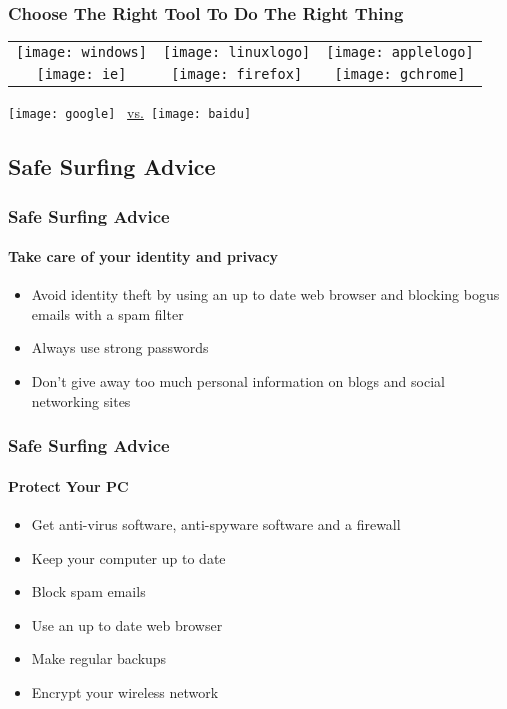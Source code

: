 \documentclass[hyperref={xetex,colorlinks,linkcolor=blue},green,compress]{beamer}
\newcommand\googlelogo{\texttt{[image: google]}}
\begin{document}
\begin{frame}\frametitle{Choose The Right Tool To Do The Right Thing}

\begin{center}
\begin{tabular}{ccc}
  \texttt{[image: windows]}&\texttt{[image: linuxlogo]}&\texttt{[image: applelogo]}\\
  \texttt{[image: ie]}&\texttt{[image: firefox]}&\texttt{[image: gchrome]}
\end{tabular}
\end{center}

\begin{center}
\begin{Huge}
\googlelogo{} ~\href{http://www.google.com/search?q=google+vs+baidu&ie=utf-8&oe=utf-8&aq=t&rls=org.debian:en-US:unofficial&client=iceweasel-a}{vs.}~\texttt{[image: baidu]}
\end{Huge}
\end{center}             

\end{frame}

\subsection[Advices]{Safe Surfing Advice}
\label{sec:advice}

\begin{frame}\frametitle{Safe Surfing Advice}\framesubtitle{Take care of your identity and privacy}

\begin{itemize}
\item Avoid identity theft by using an up to date web browser and blocking bogus emails with a spam filter
\item Always use strong passwords
\item Don’t give away too much personal information on blogs and social networking sites
\end{itemize}

\end{frame}

\begin{frame}\frametitle{Safe Surfing Advice}\framesubtitle{Protect Your PC}

\begin{itemize}
\item Get anti-virus software, anti-spyware software and a firewall
\item Keep your computer up to date
\item Block spam emails
\item Use an up to date web browser
\item Make regular backups
\item Encrypt your wireless network
\end{itemize}

\end{frame}
\end{document}
